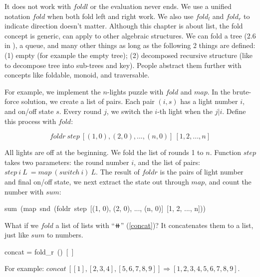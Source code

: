 \documentclass[b5paper]{article}
\begin{document}
It does not work with $foldl$ or the evaluation never ends. We use a unified notation $fold$ when both fold left and right work. We also use $fold_l$ and $fold_r$ to indicate direction doesn't matter. Although this chapter is about list, the fold concept is generic, can apply to other algebraic structures. We can fold a tree (2.6 in \cite{unplugged}), a queue, and many other things as long as the following 2 things are defined: (1) empty (for example the empty tree); (2) decomposed recursive structure (like to decompose tree into sub-trees and key). People abstract them further with concepts like foldable, monoid, and traversable.

For example, we implement the $n$-lights puzzle with $fold$ and $map$. In the brute-force solution, we create a list of pairs. Each pair $(i, s)$ has a light number $i$, and on/off state $s$. Every round $j$, we switch the $i$-th light when the $j | i$. Define this process with $fold$:

\[
foldr\ step\ [(1, 0), (2, 0), ..., (n, 0)]\ [1, 2, ..., n]
\]

All lights are off at the beginning. We fold the list of rounds 1 to $n$. Function $step$ takes two parameters: the round number $i$, and the list of pairs: $step\ i\ L\ = map\ (switch\ i)\ L$. The result of $foldr$ is the pairs of light number and final on/off state, we next extract the state out through $map$, and count the number with $sum$:

\be
sum\ (map\ snd\ (foldr\ step\ [(1, 0), (2, 0), ..., (n, 0)]\ [1, 2, ..., n]))
\ee

What if we $fold$ a list of lists with ``$\doubleplus$'' (\cref{concat})? It concatenates them to a list, just like $sum$ to numbers.

\be
concat = fold_r\ (\doubleplus)\ [\ ]
\ee

For example: $concat\ [[1], [2, 3, 4], [5, 6, 7, 8, 9]] \Rightarrow [1, 2, 3, 4, 5, 6, 7, 8, 9]$.

\begin{Exercise}\label{ex:list-fold}
\end{Exercise}
\end{document}
